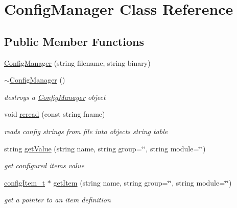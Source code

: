 \hypertarget{classConfigManager}{}\section{Config\+Manager Class Reference}
\label{classConfigManager}
\subsection*{Public Member Functions}
\begin{DoxyCompactItemize}
\item 
\hyperlink{classConfigManager_a1676cfe00c3b4e794fdc258d935347a1}{Config\+Manager} (string filename, string binary)
\item 
\mbox{\label{classConfigManager_a7fa65fdff98bdd5bbbf72196bd9ccf17}} 
\hyperlink{classConfigManager_a7fa65fdff98bdd5bbbf72196bd9ccf17}{$\sim$\+Config\+Manager} ()
\begin{DoxyCompactList}\small\item\em destroys a \hyperlink{classConfigManager}{Config\+Manager} object \end{DoxyCompactList}\item 
void \hyperlink{classConfigManager_af4ffb3955f672a1dd0fb1db39d231c2a}{reread} (const string fname)
\begin{DoxyCompactList}\small\item\em reads config strings from file into object\textquotesingle{}s string table \end{DoxyCompactList}\item 
string \hyperlink{classConfigManager_ae6ad7a04fbbc00fa5f5297daed17e4df}{get\+Value} (string name, string group=\char`\"{}\char`\"{}, string module=\char`\"{}\char`\"{})
\begin{DoxyCompactList}\small\item\em get configured item\textquotesingle{}s value \end{DoxyCompactList}\item 
\hyperlink{structconfigItem}{config\+Item\+\_\+t} $\ast$ \hyperlink{classConfigManager_a3cdebcc0fc8ce6148943963ba64ba342}{get\+Item} (string name, string group=\char`\"{}\char`\"{}, string module=\char`\"{}\char`\"{})
\begin{DoxyCompactList}\small\item\em get a pointer to an item definition \end{DoxyCompactList}\item 

\end{DoxyCompactItemize}
